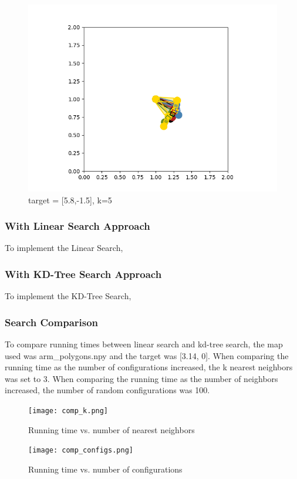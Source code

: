 \documentclass{article}
\begin{document}
\begin{figure}[htbp]
\begin{minipage}{0.45\textwidth}
    \includegraphics[width=\linewidth]{p1.2.5.png}
    \caption{target = [5.8,-1.5], k=5}
  \end{minipage}
\end{figure}
\subsubsection{With Linear Search Approach}
To implement the Linear Search,
\subsubsection{With KD-Tree Search Approach}
To implement the KD-Tree Search,
\subsubsection{Search Comparison}
To compare running times between linear search and kd-tree search, the map used was arm\_polygons.npy and the target was [3.14, 0]. When comparing the running time as the number of configurations increased, the k nearest neighbors was set to 3. When comparing the running time as the number of neighbors increased, the number of random configurations was 100. 
\begin{figure}[]
  \centering
    \texttt{[image: comp\_k.png]}
    \caption{Running time vs. number of nearest neighbors}
    \texttt{[image: comp\_configs.png]}
    \caption{Running time vs. number of configurations}
\end{figure}
\end{document}
